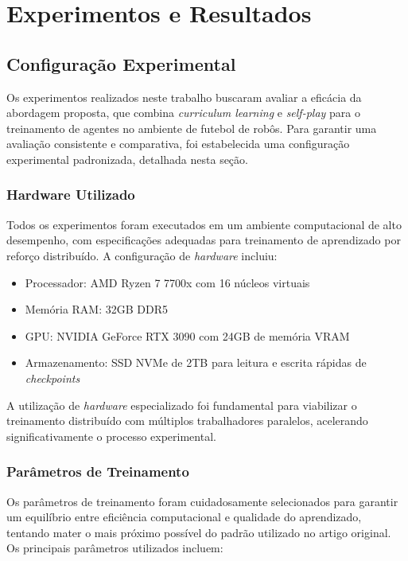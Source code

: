 \chapter{Experimentos e Resultados}
\label{cap:resultados}

\section{Configuração Experimental}
\label{sec:configuracao_experimental}

Os experimentos realizados neste trabalho buscaram avaliar a eficácia da abordagem proposta, que combina \textit{curriculum learning} e \textit{self-play} para o treinamento de agentes no ambiente de futebol de robôs. Para garantir uma avaliação consistente e comparativa, foi estabelecida uma configuração experimental padronizada, detalhada nesta seção.

\subsection{Hardware Utilizado}

Todos os experimentos foram executados em um ambiente computacional de alto desempenho, com especificações adequadas para treinamento de aprendizado por reforço distribuído. A configuração de \textit{hardware} incluiu:

\begin{itemize}
    \item Processador: AMD Ryzen 7 7700x com 16 núcleos virtuais
    \item Memória RAM: 32GB DDR5
    \item GPU: NVIDIA GeForce RTX 3090 com 24GB de memória VRAM
    \item Armazenamento: SSD NVMe de 2TB para leitura e escrita rápidas de \textit{checkpoints}
\end{itemize}

A utilização de \textit{hardware} especializado foi fundamental para viabilizar o treinamento distribuído com múltiplos trabalhadores paralelos, acelerando significativamente o processo experimental.

\subsection{Parâmetros de Treinamento}

Os parâmetros de treinamento foram cuidadosamente selecionados para garantir um equilíbrio entre eficiência computacional e qualidade do aprendizado, tentando mater o mais próximo possível do padrão utilizado no artigo original. Os principais parâmetros utilizados incluem:

